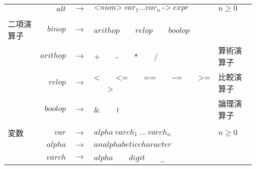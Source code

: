 \documentclass{jarticle}
\begin{document}
\begin{center}
\begin{tabular} {|l r c l l|}
		                     & $alt$     & $\rightarrow$ & $\texttt{<} num \texttt{>} ~ var_1 \ldots var_n ~ \texttt{->} ~ expr$                                                                                            & $n \geq 0$              \\
		                     &           &               &                                                                                                                                                                  &                         \\
		二項演算子           & $binop$   & $\rightarrow$ & $arithop$ ~ \textbar ~ $relop$ ~ \textbar ~ $boolop$                                                                                                             &                         \\
		                     & $arithop$ & $\rightarrow$ & $\texttt{+}$ ~ \textbar ~ $\texttt{-}$ ~ \textbar ~ $\texttt{*}$ ~ \textbar ~ $\texttt{/}$                                                                       & 算術演算子              \\
		                     & $relop$   & $\rightarrow$ & $\texttt{<}$ ~ \textbar ~ $\texttt{<=}$ ~ \textbar ~ $\texttt{==}$ ~ \textbar ~	$\texttt{\textasciitilde =}$ ~ \textbar ~ $\texttt{>=}$ ~ \textbar ~ $\texttt{>}$ & 比較演算子              \\
		                     & $boolop$  & $\rightarrow$ & $\texttt{\&}$ ~ \textbar ~ $\texttt{\textbar}$                                                                                                                   & 論理演算子              \\
		                     &           &               &                                                                                                                                                                  &                         \\
		変数                 & $var$     & $\rightarrow$ & $alpha ~ varch_1 ~ \ldots ~ varch_n$                                                                                                                             & $n \geq 0$              \\
		                     & $alpha$   & $\rightarrow$ & $an alphabetic character$                                                                                                                                        &                         \\
		                     & $varch$   & $\rightarrow$ & $alpha$ ~ \textbar ~ $digit$ ~ \textbar ~ \texttt{\_}                                                                                                            &                         \\

\end{tabular}
\end{center}
\end{document}
